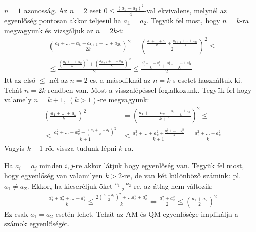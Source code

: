    $n=1$ azonosság. Az $n=2$ eset $0\le \frac{(a_{1}-a_{2})^2}{4}$-val ekvivalens, 
   melynél az egyenlőség pontosan akkor teljesül ha $a_{1}=a_{2}.$
   Tegyük fel most, hogy $n=k$-ra megvagyunk és vizsgáljuk az $n=2k$-t:
   \begin{align*}
   {\left( \frac{a_{1}+\hdots +a_{k}+a_{k+1}+\hdots +a_{2k}}{2k} \right)}^{2} =
   {\left( \frac{\frac{a_{1}+\hdots +a_{k}}{k}+\frac{a_{k+1}+\hdots +a_{2k}}{k}}{2} \right)}^{2} \le \\
   \le 
   \frac{{\left( \frac{a_{1}+\hdots +a_{k}}{k}\right)}^{2}+
   {\left( \frac{a_{k+1}+\hdots +a_{2k}}{k}\right)}^{2}}{2} \le
   \frac{\frac{a_{1}^{2}+\hdots +a_{k}^{2}}{k}+
   \frac{a_{k+1}^{2}+\hdots +a_{2k}^{2}}{k}}{2} 
   \end{align*}
   Itt az első $\le$-nél az $n=2$-es, a másodiknál az $n=k$-s esetet 
   használtuk ki. Tehát $n=2k$ rendben van. Most a visszalépéssel foglalkozunk. 
   Tegyük fel hogy valamely $n=k+1,\ (k>1)$-re megvagyunk:
   \begin{align*}
   {\left( \frac{a_{1}+\hdots +a_{k}}{k} \right) }^2 &=
   {\left( \frac{a_{1}+\hdots +a_{k}+\frac{a_{1}+\hdots +a_{k}}{k}}{k+1} \right) }^2 \le \\
   \le \frac{a_{1}^{2}+\hdots +a_{k}^{2}+
   {\left( \frac{a_{1}+\hdots +a_{k}}{k} \right)}^2 }{k+1} &\le
   \frac{a_{1}^{2}+\hdots +a_{k}^{2}+
   { \frac{a_{1}^2+\hdots +a_{k}^2}{k} }}{k+1} = \frac{a_{1}^2+\hdots +a_{k}^2}{k}
   \end{align*}
   Vagyis $k+1$-ről vissza tudunk lépni $k$-ra.
   \par Ha $a_{i}=a_{j}$ minden $i,j$-re akkor látjuk hogy egyenlőség van. 
   Tegyük fel most, hogy egyenlőség van valamilyen $k>2$-re, 
   de van két különböző számink: pl. $a_{1}\neq a_{2}.$
   Ekkor, ha kicseréljuk őket $\frac{a_{1}+a_{2}}{2}$-re, az 
   átlag nem változik:
   \begin{align*}
   \frac{a_{1}^2+a_{2}^2+\hdots +a_{k}^2}{k}\le
   \frac{2{\left( \frac{a_{1}+a_{2}}{2}\right)}^2+\hdots a_{3}^2+a_{k}^2}{k} \Leftrightarrow
   \frac{a_{1}^2+a_{2}^2}{2} \leq {\left( \frac{a_{1}+a_{2}}{2}\right)}^2
   \end{align*}
   \newline
   Ez csak $a_{1}=a_{2}$ esetén lehet. Tehát az AM és QM egyenlősége 
   implikálja a számok egyenlőségét.
